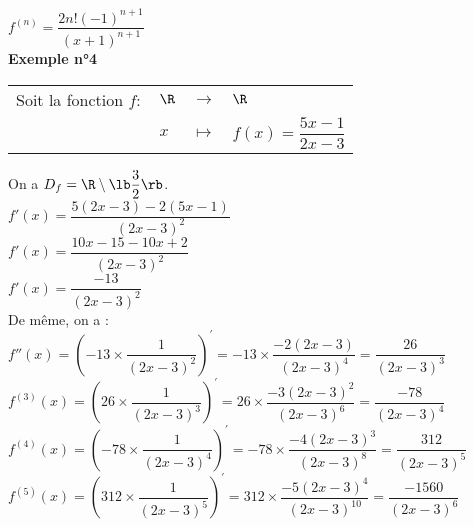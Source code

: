 $f^{(n)} = \dfrac{2n!\left(-1\right)^{n+1}}{\left(x+1\right)^{n+1}}$ \\

\textbf{Exemple n°4} \\

\begin{tabular}{llll}
Soit la fonction $f :$ & $\R$ & $\longrightarrow$ & $\R$ \\
& $x$ & $\longmapsto$ & $f(x) = \dfrac{5x-1}{2x-3}$ \\
\end{tabular}

On a $D_f = \R \setminus \lb \dfrac{3}{2} \rb$. \vspace*{.3cm} \\

$f'(x) = \dfrac{5\left(2x - 3\right)-2\left(5x-1\right)}{\left(2x-3\right)^2}$ \vspace*{.3cm} \\

$f'(x) = \dfrac{10x - 15 - 10x + 2}{\left(2x - 3\right)^2}$ \vspace*{.3cm} \\

$f'(x) = \dfrac{-13}{\left(2x - 3\right)^2}$ \vspace*{.3cm} \\

De même, on a : $f''(x) = \left(-13 \times \dfrac{1}{\left(2x - 3\right)^2}\right)^{'} = -13 \times \dfrac{-2\left(2x - 3\right)}{\left(2x - 3\right)^4} = \dfrac{26}{\left(2x - 3\right)^3}$ \vspace*{.3cm} \\

$f^{(3)}(x) = \left(26 \times \dfrac{1}{\left(2x - 3\right)^3}\right)^{'} = 26 \times \dfrac{-3\left(2x - 3\right)^2}{\left(2x - 3\right)^6} = \dfrac{-78}{\left(2x - 3\right)^4}$ \vspace*{.3cm} \\

$f^{(4)}(x) = \left(-78 \times \dfrac{1}{\left(2x - 3\right)^4}\right)^{'} = -78 \times \dfrac{-4\left(2x - 3\right)^3}{\left(2x - 3\right)^8} = \dfrac{312}{\left(2x - 3\right)^5}$ \vspace*{.3cm} \\

$f^{(5)}(x) = \left(312 \times \dfrac{1}{\left(2x - 3\right)^5}\right)^{'} = 312 \times \dfrac{-5\left(2x - 3\right)^4}{\left(2x - 3\right)^{10}} = \dfrac{-1560}{\left(2x - 3\right)^6}$ \vspace*{.3cm} 

